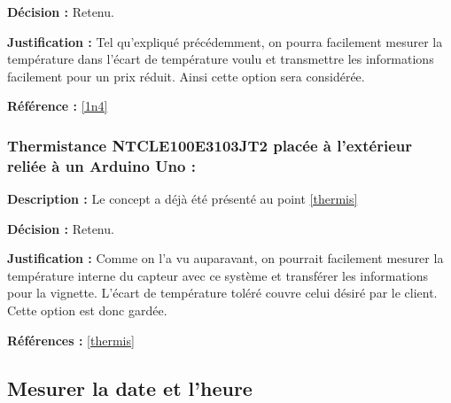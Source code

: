 \textbf{Décision :} Retenu.

\textbf{Justification :} Tel qu'expliqué précédemment, on pourra facilement mesurer la température dans l'écart de température voulu et transmettre les informations facilement pour un prix réduit. Ainsi cette option sera considérée. 

\textbf{Référence :} \ref{1n4}

\subsubsection{Thermistance NTCLE100E3103JT2 placée à l’extérieur reliée à un Arduino Uno :}
\textbf{Description :} Le concept a déjà été présenté au point \ref{thermis}

\textbf{Décision :} Retenu.

\textbf{Justification :} Comme on l'a vu auparavant, on pourrait facilement mesurer la température interne du capteur avec ce système et transférer les informations pour la vignette. L'écart de température toléré couvre celui désiré par le client. Cette option est donc gardée.

\textbf{Références :} \ref{thermis}

\begin{table}[!htb]
\footnotesize
\centering
{}
\caption{Faisabilité des concepts pour mesurer la température interne}
\label{t:Decision_thermo_int}
\end{table}

\subsection{Mesurer la date et l'heure}

